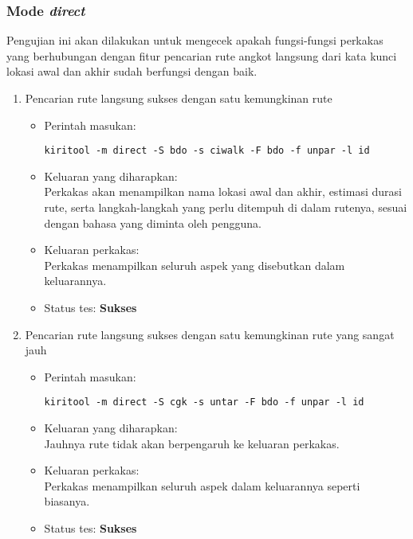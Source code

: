 \begin{enumerate}
\end{enumerate}

\subsubsection{Mode \textit{direct}}
\label{sec:testing-experiments-directroute}

Pengujian ini akan dilakukan untuk mengecek apakah fungsi-fungsi perkakas yang berhubungan dengan fitur pencarian rute angkot langsung dari kata kunci lokasi awal dan akhir sudah berfungsi dengan baik.

\begin{enumerate}
	\item Pencarian rute langsung sukses dengan satu kemungkinan rute
	\begin{itemize}
		\item Perintah masukan:
		\begin{verbatim}
kiritool -m direct -S bdo -s ciwalk -F bdo -f unpar -l id
		\end{verbatim}
		\item Keluaran yang diharapkan: \\
		Perkakas akan menampilkan nama lokasi awal dan akhir, estimasi durasi rute, serta langkah-langkah yang perlu ditempuh di dalam rutenya, sesuai dengan bahasa yang diminta oleh pengguna.
		\item Keluaran perkakas: \\
		Perkakas menampilkan seluruh aspek yang disebutkan dalam keluarannya.
		\item Status tes: \textbf{Sukses}
	\end{itemize}
	
	\item Pencarian rute langsung sukses dengan satu kemungkinan rute yang sangat jauh
	\begin{itemize}
		\item Perintah masukan:
		\begin{verbatim}
kiritool -m direct -S cgk -s untar -F bdo -f unpar -l id
		\end{verbatim}
		\item Keluaran yang diharapkan: \\
		Jauhnya rute tidak akan berpengaruh ke keluaran perkakas.
		\item Keluaran perkakas: \\
		Perkakas menampilkan seluruh aspek dalam keluarannya seperti biasanya.
		\item Status tes: \textbf{Sukses}
	\end{itemize}
	

\end{enumerate}
